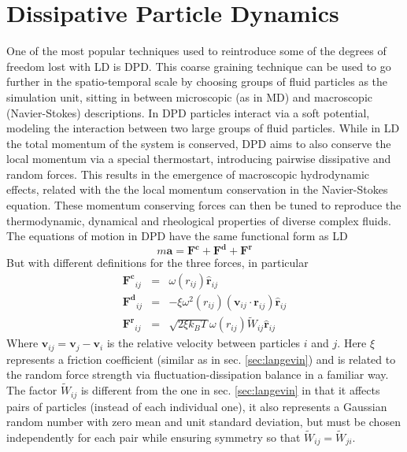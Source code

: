 \documentclass[ twoside,openright,titlepage,numbers=noenddot,%
headinclude,footinclude,cleardoublepage=empty,abstract=on,
BCOR=5mm,paper=a4,fontsize=11pt, dvipsnames
]{scrreprt}
\renewcommand{\vec}[1]{\bm{#1}}
\newcommand{\kT}{k_B T}
\begin{document}
\section{Dissipative Particle Dynamics}
One of the most popular techniques used to reintroduce some of the degrees of freedom lost with \gls{LD} is \gls{DPD}. This coarse graining technique can be used to go further in the spatio-temporal scale by choosing groups of fluid particles as the simulation unit, sitting in between microscopic (as in \gls{MD}) and macroscopic (Navier-Stokes) descriptions.
In \gls{DPD} particles interact via a soft potential, modeling the interaction between two large groups of fluid particles.
While in \gls{LD} the total momentum of the system is conserved, \gls{DPD} aims to also conserve the local momentum via a special thermostart, introducing pairwise dissipative and random forces. This results in the emergence of macroscopic hydrodynamic effects, related with the  the local momentum conservation in the Navier-Stokes equation. These momentum conserving forces can then be tuned to reproduce the thermodynamic, dynamical and rheological properties of diverse complex fluids.
The equations of motion in \gls{DPD} have the same functional form as \gls{LD}
\begin{equation}
  \label{eq:dpddyn}
  m\vec{a} = \vec{F^c} + \vec{F^d} + \vec{F^r}
\end{equation}
But with different definitions for the three forces, in particular
\begin{equation}
  \label{eq:dpdforces}
  \begin{aligned}
    \vec{F^c}_{ij} &=&\omega(r_{ij})\hat{\vec{r}}_{ij}\\
    \vec{F^d}_{ij} &=&-\xi\omega^2(r_{ij})(\vec{v}_{ij}\cdot\vec{r}_{ij})\hat{\vec{r}}_{ij}\\
    \vec{F^r}_{ij} &=&\sqrt{2\xi\kT}\omega(r_{ij})\widetilde{W}_{ij}\hat{\vec{r}}_{ij}    
  \end{aligned}
\end{equation}
Where $\vec{v}_{ij} = \vec{v}_j - \vec{v}_i$ is the relative velocity between particles $i$ and $j$. Here $\xi$ represents a friction coefficient (similar as in sec. \ref{sec:langevin}) and is related to the random force strength via fluctuation-dissipation balance in a familiar way\cite{Espanol1995}. The factor $\widetilde{W}_{ij}$ is different from the one in sec. \ref{sec:langevin} in that it affects pairs of particles (instead of each individual one), it also represents a Gaussian random number with zero mean and unit standard deviation, but must be chosen independently for each pair while ensuring symmetry so that $\widetilde{W}_{ij} = \widetilde{W}_{ji}$.
\end{document}
